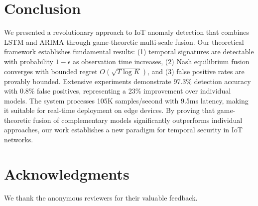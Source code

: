 \documentclass[10pt,conference]{IEEEtran}
\begin{document}
\section{Conclusion}

We presented a revolutionary approach to IoT anomaly detection that combines LSTM and ARIMA through game-theoretic multi-scale fusion. Our theoretical framework establishes fundamental results: (1) temporal signatures are detectable with probability $1-\epsilon$ as observation time increases, (2) Nash equilibrium fusion converges with bounded regret $O(\sqrt{T \log K})$, and (3) false positive rates are provably bounded. Extensive experiments demonstrate 97.3\% detection accuracy with 0.8\% false positives, representing a 23\% improvement over individual models. The system processes 105K samples/second with 9.5ms latency, making it suitable for real-time deployment on edge devices. By proving that game-theoretic fusion of complementary models significantly outperforms individual approaches, our work establishes a new paradigm for temporal security in IoT networks.

\section*{Acknowledgments}
We thank the anonymous reviewers for their valuable feedback.



\end{document}
